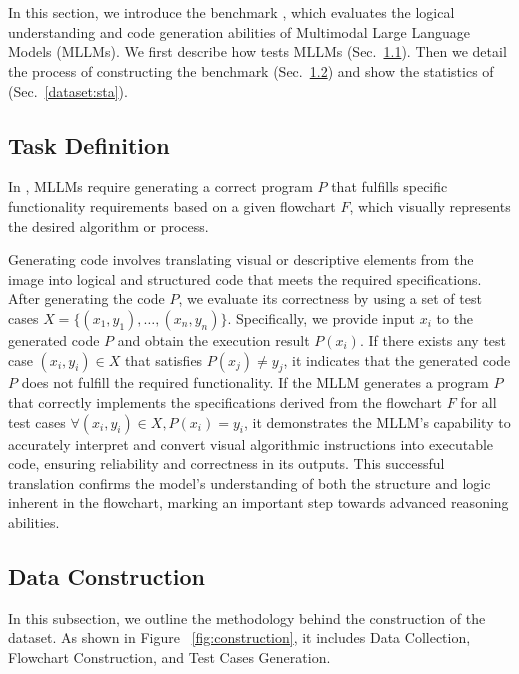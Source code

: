 
\section{\benchmark}
In this section, we introduce the benchmark \benchmark, which evaluates the logical understanding and code generation abilities of Multimodal Large Language Models (MLLMs). We first describe how \benchmark tests MLLMs (Sec.~\ref{dataset:definition}). Then we detail the process of constructing the \benchmark benchmark (Sec.~\ref{dataset:collection}) and show the statistics of \benchmark(Sec.~\ref{dataset:sta}).


\subsection{Task Definition}\label{dataset:definition}

In \benchmark, MLLMs require generating a correct program \( P \) that fulfills specific functionality requirements based on a given flowchart \( F \), which visually represents the desired algorithm or process. 

Generating code involves translating visual or descriptive elements from the image into logical and structured code that meets the required specifications. After generating the code \( P \), we evaluate its correctness by using a set of test cases \( X = \{(x_1, y_1), \ldots, (x_n, y_n)\} \). Specifically, we provide input \( x_i \) to the generated code \( P \) and obtain the execution result \( P(x_i) \). If there exists any test case \( (x_i, y_i) \in X \) that satisfies \( P(x_j) \neq y_j \), it indicates that the generated code \( P \) does not fulfill the required functionality. If the MLLM generates a program \( P \) that correctly implements the specifications derived from the flowchart \( F \) for all test cases \( \forall (x_i, y_i) \in X, P(x_i) = y_i \), it demonstrates the MLLM's capability to accurately interpret and convert visual algorithmic instructions into executable code, ensuring reliability and correctness in its outputs. This successful translation confirms the model's understanding of both the structure and logic inherent in the flowchart, marking an important step towards advanced reasoning abilities.



\subsection{Data Construction}\label{dataset:collection}
In this subsection, we outline the methodology behind the construction of the \benchmark dataset. As shown in Figure ~\ref{fig:construction}, it includes Data Collection, Flowchart Construction, and Test Cases Generation.

